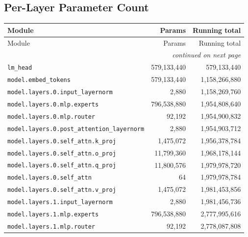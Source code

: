 \documentclass[10pt,a4paper]{article}
\theoremstyle{definition}
\begin{document}
\begin{appendices}
\section{Per-Layer Parameter Count}
\begin{longtable}{p{9.5cm}rr}
\toprule
Module & Params & Running total \\
\midrule
\endfirsthead
\toprule
Module & Params & Running total \\
\midrule
\endhead
\midrule \multicolumn{3}{r}{\textit{continued on next page}} \\
\endfoot
\bottomrule
\endlastfoot
\texttt{lm\_head} & 579,133,440 & 579,133,440 \\
\texttt{model.\allowbreak{}embed\_tokens} & 579,133,440 & 1,158,266,880 \\
\texttt{model.\allowbreak{}layers.\allowbreak{}0.\allowbreak{}input\_layernorm} & 2,880 & 1,158,269,760 \\
\texttt{model.\allowbreak{}layers.\allowbreak{}0.\allowbreak{}mlp.\allowbreak{}experts} & 796,538,880 & 1,954,808,640 \\
\texttt{model.\allowbreak{}layers.\allowbreak{}0.\allowbreak{}mlp.\allowbreak{}router} & 92,192 & 1,954,900,832 \\
\texttt{model.\allowbreak{}layers.\allowbreak{}0.\allowbreak{}post\_attention\_layernorm} & 2,880 & 1,954,903,712 \\
\texttt{model.\allowbreak{}layers.\allowbreak{}0.\allowbreak{}self\_attn.\allowbreak{}k\_proj} & 1,475,072 & 1,956,378,784 \\
\texttt{model.\allowbreak{}layers.\allowbreak{}0.\allowbreak{}self\_attn.\allowbreak{}o\_proj} & 11,799,360 & 1,968,178,144 \\
\texttt{model.\allowbreak{}layers.\allowbreak{}0.\allowbreak{}self\_attn.\allowbreak{}q\_proj} & 11,800,576 & 1,979,978,720 \\
\texttt{model.\allowbreak{}layers.\allowbreak{}0.\allowbreak{}self\_attn} & 64 & 1,979,978,784 \\
\texttt{model.\allowbreak{}layers.\allowbreak{}0.\allowbreak{}self\_attn.\allowbreak{}v\_proj} & 1,475,072 & 1,981,453,856 \\
\texttt{model.\allowbreak{}layers.\allowbreak{}1.\allowbreak{}input\_layernorm} & 2,880 & 1,981,456,736 \\
\texttt{model.\allowbreak{}layers.\allowbreak{}1.\allowbreak{}mlp.\allowbreak{}experts} & 796,538,880 & 2,777,995,616 \\
\texttt{model.\allowbreak{}layers.\allowbreak{}1.\allowbreak{}mlp.\allowbreak{}router} & 92,192 & 2,778,087,808 \\

\end{longtable}
\end{appendices}
\end{document}
